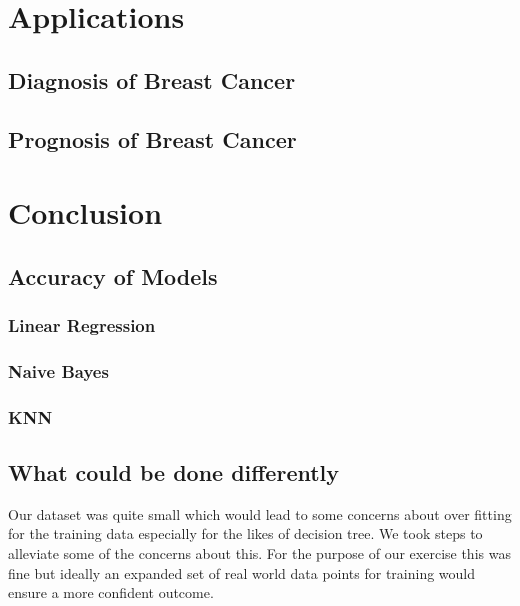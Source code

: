 \documentclass[conference]{IEEEtran}
\begin{document}
\section{Applications}
\subsection{Diagnosis of Breast Cancer}
\subsection{Prognosis of Breast Cancer}
\section{Conclusion}
\subsection{Accuracy of Models}
\subsubsection{Linear Regression}
\subsubsection{Naive Bayes}
\subsubsection{KNN}

\subsection{What could be done differently}
Our dataset was quite small which would lead to some concerns about over fitting for the training data especially for the likes of decision tree. We took steps to alleviate some of the concerns about this. For the purpose of our exercise this was fine but ideally an expanded set of real world data points for training would ensure a more confident outcome.
\newpage
\clearpage
\printbibliography
\listoffigures
\end{document}
